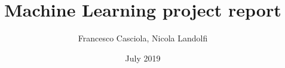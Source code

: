 \documentclass[a4paper,12pt]{book}
\begin{document}
\author{Francesco Casciola, Nicola Landolfi}
\title{Machine Learning project report}
\date{July 2019}

\frontmatter
\maketitle
\tableofcontents

\mainmatter




\backmatter
{}

\end{document}
